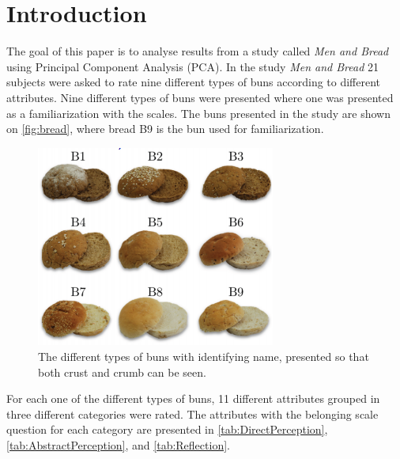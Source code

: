 \chapter*{Introduction}
\label{introduction}
%
The goal of this paper is to analyse results from a study called \textit{Men and Bread} using Principal Component Analysis (PCA). \blankline
%
In the study \textit{Men and Bread} 21 subjects were asked to rate nine different types of buns according to different attributes. Nine different types of buns were presented where one was presented as a familiarization with the scales. The buns presented in the study are shown on \autoref{fig:bread}, where bread B9 is the bun used for familiarization. 
%
\begin{figure}[H]
\centering
\includegraphics[width =0.7\textwidth]{Figure/Bread}
\caption{The different types of buns with identifying name, presented so that both crust and crumb can be seen.}
\label{fig:bread}
\end{figure}
\noindent
%
For each one of the different types of buns, 11 different attributes grouped in three different categories were rated. The attributes with the belonging scale question for each category are presented in \autoref{tab:DirectPerception}, \autoref{tab:AbstractPerception}, and \autoref{tab:Reflection}.
%
